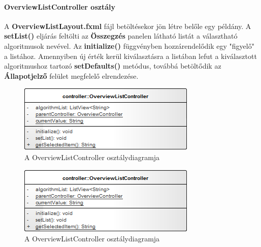 \documentclass{elteikthesis}
\begin{document}
\paragraph{OverviewListController osztály}
A \textbf{OverviewListLayout.fxml} fájl betöltésekor jön létre belőle egy példány. A \textbf{setList()} eljárás feltölti az \textbf{Összegzés} panelen látható listát a választható algoritmusok nevével. Az \textbf{initialize()} függvényben hozzárendelődik egy "figyelő" a listához. Amennyiben új érték kerül kiválasztásra a listában lefut a kiválasztott algoritmushoz tartozó \textbf{setDefaults()} metódus, továbbá betöltődik az \textbf{Állapotjelző} felület megfelelő elrendezése.
\begin{figure}[H]
	\centering
	\includegraphics{pics/class/OverviewListController.png}
	\caption{A OverviewListController osztálydiagramja}
\end{figure}
\begin{figure}[H]
	\centering
	\includegraphics{pics/class/OverviewListController.png}
	\caption{A OverviewListController osztálydiagramja}
\end{figure}
\end{document}
